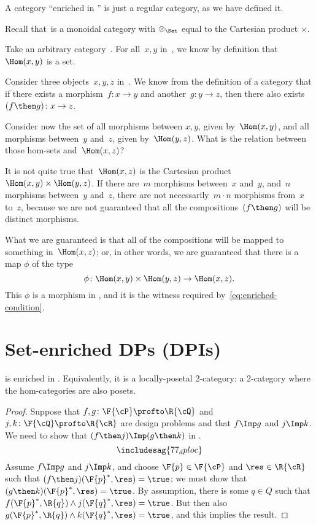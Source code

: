 \begin{example}
  A category ``enriched in \Set'' is just a regular category, as we have defined it.

  Recall that~\Set is a monoidal category with $\otimes_{\Set}$ equal to the Cartesian product $\times$.

  Take an arbitrary category~\CatC. For all~$x, y$ in~\CatC, we know by definition
  that~$\Hom(x,y)$ is a set.

  Consider three objects~$x,y,z$ in~\CatC. We know from the definition of a
  category that if there exists a morphism~$f: x \to y$ and another~$g: y \to z$,
  then there also exists~$(f\then g)\colon x \to z$.

  Consider now the set of all morphisms between $x, y$, given by~$\Hom(x,y)$, and
  all morphisms between~$y$ and~$z$, given by~$\Hom(y, z)$. What is the relation
  between those hom-sets and~$\Hom(x, z)$?

  It is not quite true that~$\Hom(x, z)$ is the Cartesian product~$\Hom(x, y)
  \times \Hom(y, z)$. If there are~$m$ morphisms between~$x$ and~$y$, and~$n$
  morphisms between~$y$ and~$z$, there are not necessarily~$m \cdot n$ morphisms
  from~$x$ to~$z$, because we are not guaranteed that all the compositions~$(f\then g)$
  will be distinct morphisms.

  What we are guaranteed is that all of the compositions will be mapped to something in~$\Hom(x, z)$; or, in other words, we are guaranteed that there
  is a map $\phi$ of the type
  \begin{equation*}
    \phi \colon \Hom(x, y) \times \Hom(y, z) \rightarrow \Hom(x, z).
  \end{equation*}
  This $\phi$ is a morphism in \Set, and it is the witness required by~\cref{eq:enriched-condition}.

\end{example}


\section{Set-enriched DPs (DPIs)}

\begin{proposition}
  \label{prop:DP_loc_pos}
  \DP is enriched in \Pos. Equivalently, it is a locally-posetal 2-category: a 2-category where the hom-categories are also posets.
\end{proposition}
\begin{proof}
  Suppose that $f,g\colon \F{\cP} \profto \R{\cQ}$ and $j,k\colon \F{\cQ} \profto \R{\cR}$ are design problems and that $f\Imp g$ and $j\Imp k$. We need to show that $(f\then j)\Imp(g\then k)$ in \DP.
  \begin{equation*}
    \includesag{77_dploc}
  \end{equation*}
  Assume $f\Imp g$ and $j\Imp k$, and choose $\F{p}\in\F{\cP} $ and $\res\in\R{\cR}$ such that $(f\then j)(\F{p}^*,\res)=\true$; we must show that $(g \then k)(\F{p}^*,\res)=\true$. By assumption, there is some $q\in Q$ such that $f(\F{p}^*,\R{q})\wedge j(\F{q}^*,\res)=\true$. But then also $g(\F{p}^*,\R{q})\wedge k(\F{q}^*,\res)=\true$, and this implies the result.
\end{proof}

